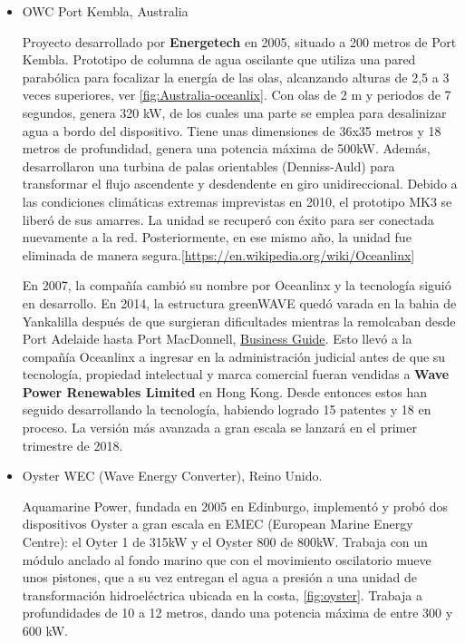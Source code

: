 \begin{itemize}
\item
  OWC Port Kembla, Australia

  Proyecto desarrollado por \textbf{Energetech} en 2005, situado a 200
  metros de Port Kembla. Prototipo de columna de agua oscilante que
  utiliza una pared parabólica para focalizar la energía de las olas,
  alcanzando alturas de 2,5 a 3 veces superiores, ver \autoref{fig:Australia-oceanlix}. Con olas de 2 m y
  periodos de 7 segundos, genera 320 kW, de los cuales una parte se
  emplea para desalinizar agua a bordo del dispositivo. Tiene unas
  dimensiones de 36x35 metros y 18 metros de profundidad, genera una
  potencia máxima de 500kW. Además, desarrollaron una turbina de palas
  orientables (Denniss-Auld) para transformar el flujo ascendente y
  desdendente en giro unidireccional. Debido a las condiciones
  climáticas extremas imprevistas en 2010, el prototipo MK3 se liberó de
  sus amarres. La unidad se recuperó con éxito para ser conectada
  nuevamente a la red. Posteriormente, en ese mismo año, la unidad fue
  eliminada de manera
  segura.{[}\url{https://en.wikipedia.org/wiki/Oceanlinx}{]}



  En 2007, la compañía cambió su nombre por Oceanlinx y la tecnología
  siguió en desarrollo. En 2014, la estructura greenWAVE quedó varada en
  la bahia de Yankalilla después de que surgieran dificultades mientras
  la remolcaban desde Port Adelaide hasta Port MacDonnell,
  \href{https://www.offshorewind.biz/2015/04/14/greenwave-still-stranded-off-south-australia/}{Business
  Guide}. Esto llevó a la compañía Oceanlinx a ingresar en la
  administración judicial antes de que su tecnología, propiedad
  intelectual y marca comercial fueran vendidas a \textbf{Wave Power
  Renewables Limited} en Hong Kong. Desde entonces estos han seguido
  desarrollando la tecnología, habiendo logrado 15 patentes y 18 en
  proceso. La versión más avanzada a gran escala se lanzará en el primer
  trimestre de 2018.
\item
  Oyster WEC (Wave Energy Converter), Reino Unido.

  Aquamarine Power, fundada en 2005 en Edinburgo, implementó y probó dos
  dispositivos Oyster a gran escala en EMEC (European Marine Energy
  Centre): el Oyter 1 de 315kW y el Oyster 800 de 800kW. Trabaja con un
  módulo anclado al fondo marino que con el movimiento oscilatorio mueve
  unos pistones, que a su vez entregan el agua a presión a una unidad de
  transformación hidroeléctrica ubicada en la costa, \autoref{fig:oyster}. Trabaja a
  profundidades de 10 a 12 metros, dando una potencia máxima de entre
  300 y 600 kW.


\end{itemize}
